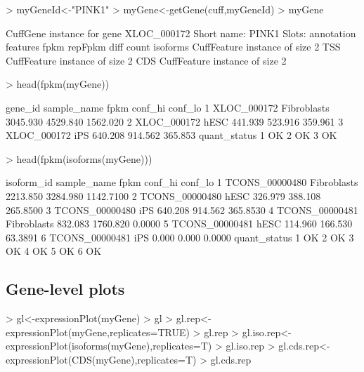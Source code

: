 \documentclass[10pt]{article}
\begin{document}
\begin{Schunk}
\begin{Sinput}
> myGeneId<-"PINK1"
> myGene<-getGene(cuff,myGeneId)
> myGene
\end{Sinput}
\begin{Soutput}
CuffGene instance for gene XLOC_000172 
Short name:	 PINK1 
Slots:
	 annotation
	 features
	 fpkm
	 repFpkm
	 diff
	 count
	 isoforms	 CuffFeature instance of size 2 
	 TSS		 CuffFeature instance of size 2 
	 CDS		 CuffFeature instance of size 2 
\end{Soutput}
\begin{Sinput}
> head(fpkm(myGene))
\end{Sinput}
\begin{Soutput}
      gene_id sample_name     fpkm  conf_hi  conf_lo
1 XLOC_000172 Fibroblasts 3045.930 4529.840 1562.020
2 XLOC_000172        hESC  441.939  523.916  359.961
3 XLOC_000172         iPS  640.208  914.562  365.853
  quant_status
1           OK
2           OK
3           OK
\end{Soutput}
\begin{Sinput}
> head(fpkm(isoforms(myGene)))
\end{Sinput}
\begin{Soutput}
      isoform_id sample_name     fpkm  conf_hi   conf_lo
1 TCONS_00000480 Fibroblasts 2213.850 3284.980 1142.7100
2 TCONS_00000480        hESC  326.979  388.108  265.8500
3 TCONS_00000480         iPS  640.208  914.562  365.8530
4 TCONS_00000481 Fibroblasts  832.083 1760.820    0.0000
5 TCONS_00000481        hESC  114.960  166.530   63.3891
6 TCONS_00000481         iPS    0.000    0.000    0.0000
  quant_status
1           OK
2           OK
3           OK
4           OK
5           OK
6           OK
\end{Soutput}
\end{Schunk}

\subsection{Gene-level plots}
\begin{Schunk}
\begin{Sinput}
> gl<-expressionPlot(myGene)
> gl
> gl.rep<-expressionPlot(myGene,replicates=TRUE)
> gl.rep
> gl.iso.rep<-expressionPlot(isoforms(myGene),replicates=T)
> gl.iso.rep
> gl.cds.rep<-expressionPlot(CDS(myGene),replicates=T)
> gl.cds.rep
\end{Sinput}
\end{Schunk}
\end{document}
